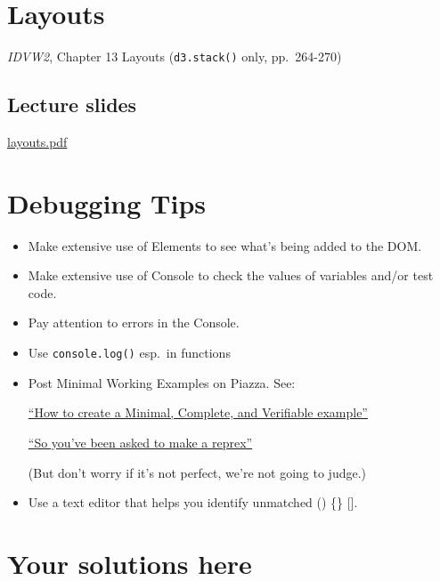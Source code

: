 \documentclass[
  openany]{book}
\begin{document}
\hypertarget{layouts}{%
\chapter{\texorpdfstring{Layouts }{Layouts }}\label{layouts}}

\emph{IDVW2}, Chapter 13 Layouts (\texttt{d3.stack()} only, pp.~264-270)

\hypertarget{lecture-slides-7}{%
\section{\texorpdfstring{Lecture slides }{Lecture slides }}\label{lecture-slides-7}}

\href{pdfs/layouts.pdf}{layouts.pdf}

\hypertarget{debugging-tips}{%
\chapter{\texorpdfstring{Debugging Tips }{Debugging Tips }}\label{debugging-tips}}

\begin{itemize}
\item
  Make extensive use of Elements to see what's being added to the DOM.
\item
  Make extensive use of Console to check the values of variables and/or test code.
\item
  Pay attention to errors in the Console.
\item
  Use \texttt{console.log()} esp.~in functions
\item
  Post Minimal Working Examples on Piazza. See:

  \href{https://stackoverflow.com/help/mcve}{``How to create a Minimal, Complete, and Verifiable example''}

  \href{https://www.jessemaegan.com/post/so-you-ve-been-asked-to-make-a-reprex/}{``So you've been asked to make a reprex''}

  (But don't worry if it's not perfect, we're not going to judge.)
\item
  Use a text editor that helps you identify unmatched () \{\} {[}{]}.
\end{itemize}

\hypertarget{your-solutions-here}{%
\chapter{\texorpdfstring{Your solutions here }{Your solutions here }}\label{your-solutions-here}}
\end{document}
